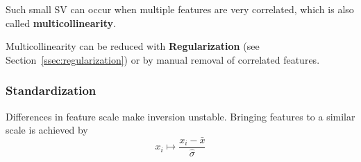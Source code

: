 Such small SV can occur when multiple features are very correlated, which is also called \textbf{multicollinearity}.

Multicollinearity can be reduced with \textbf{Regularization} (see Section\ \ref{ssec:regularization}) or by manual removal of correlated features.



\subsubsection{Standardization}
Differences in feature scale make inversion unstable. Bringing features to a similar scale is achieved by
\noindent\begin{equation*}
    x_i\mapsto\frac{x_i-\bar{x}}{\widehat{\sigma}}
\end{equation*}
